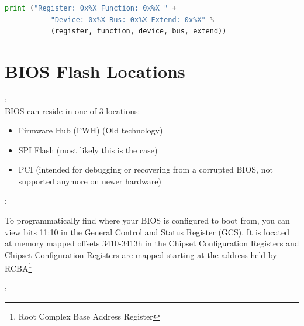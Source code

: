 \begin{note}
\begin{lstlisting}[language=Python]
	print ("Register: 0x%X Function: 0x%X " +
	       "Device: 0x%X Bus: 0x%X Extend: 0x%X" %
	       (register, function, device, bus, extend))
\end{lstlisting}
\end{note}


\section{BIOS Flash Locations}
\begin{note}:\\
BIOS can reside in one of 3 locations:
\begin{itemize}
	\item Firmware Hub (FWH) (Old technology)
	\item SPI Flash (most likely this is the case)
	\item PCI (intended for debugging or recovering from a corrupted BIOS, not supported anymore on newer hardware)
\end{itemize}

\end{note}
\begin{note}:
	
To programmatically find where your BIOS is configured to boot from, you can view bits 11:10 in the General Control and Status Register (GCS). It is located at memory mapped offsets 3410-3413h in the Chipset Configuration Registers and Chipset Configuration Registers are mapped starting at the address held by RCBA\footnote{Root Complex Base Address Register}
\end{note}

\begin{note}:
	
\end{note}

